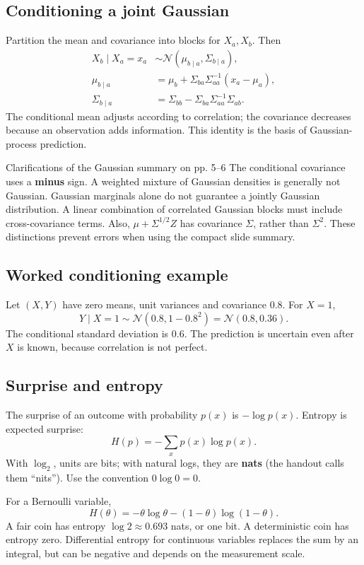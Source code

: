 \documentclass[11pt]{article}
\begin{document}
\subsection{Conditioning a joint Gaussian}
Partition the mean and covariance into blocks for $X_a,X_b$. Then
\begin{align*}
X_b\mid X_a=x_a&\sim\mathcal N(\mu_{b\mid a},\Sigma_{b\mid a}),\\
\mu_{b\mid a}&=\mu_b+\Sigma_{ba}\Sigma_{aa}^{-1}(x_a-\mu_a),\\
\Sigma_{b\mid a}&=\Sigma_{bb}-\Sigma_{ba}\Sigma_{aa}^{-1}\Sigma_{ab}.
\end{align*}
The conditional mean adjusts according to correlation; the covariance decreases because an observation adds information. This identity is the basis of Gaussian-process prediction.
\begin{careful}{Clarifications of the Gaussian summary on pp. 5--6}
The conditional covariance uses a \textbf{minus} sign. A weighted mixture of Gaussian densities is generally not Gaussian. Gaussian marginals alone do not guarantee a jointly Gaussian distribution. A linear combination of correlated Gaussian blocks must include cross-covariance terms. Also, $\mu+\Sigma^{1/2}Z$ has covariance $\Sigma$, rather than $\Sigma^2$. These distinctions prevent errors when using the compact slide summary.
\end{careful}
\subsection{Worked conditioning example}
Let $(X,Y)$ have zero means, unit variances and covariance $0.8$. For $X=1$,
\[
Y\mid X=1\sim\mathcal N(0.8,1-0.8^2)=\mathcal N(0.8,0.36).
\]
The conditional standard deviation is $0.6$. The prediction is uncertain even after $X$ is known, because correlation is not perfect.
\subsection{Surprise and entropy}
The surprise of an outcome with probability $p(x)$ is $-\log p(x)$. Entropy is expected surprise:
\[
H(p)=-\sum_xp(x)\log p(x).
\]
With $\log_2$, units are bits; with natural logs, they are \textbf{nats} (the handout calls them ``nits''). Use the convention $0\log0=0$.

For a Bernoulli variable,
\[
H(\theta)=-\theta\log\theta-(1-\theta)\log(1-\theta).
\]
A fair coin has entropy $\log2\approx0.693$ nats, or one bit. A deterministic coin has entropy zero. Differential entropy for continuous variables replaces the sum by an integral, but can be negative and depends on the measurement scale.
\end{document}
